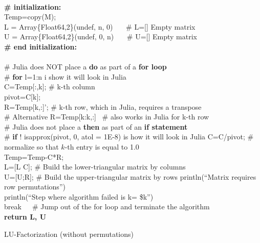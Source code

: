    
\vspace*{.4cm}


\begin{tcolorbox}[sharp corners, colback=green!30, colframe=green!80!blue, title=\textbf{\Large LU Factorization}]
\begin{algorithm}[H]
\SetAlgoLined
{}
\mbox{} \\
 \textbf{\# initialization:}\\
 {\rm Temp}=copy(M); \\
L = Array\{Float64,2\}(undef, n, 0)  ~~~\# L=[] Empty matrix\\
U = Array\{Float64,2\}(undef, 0, n)  ~~~\# U=[] Empty matrix\\
  \textbf{\# end initialization:}\\
  \mbox{} \\
 {
    \# Julia does NOT place a \textbf{do} as part of a \textbf{for loop} \\
    \# \textbf{for} l=1:n i show it will look in Julia\\
    C=Temp[:,k]; \# k-th column \\
        pivot=C[k]; \\
    R={\rm Temp}[k,:]'; \# k-th row, which in Julia, requires a transpose\\
    \# Alternative R={\rm Temp}[k:k,:] ~\# also works in Julia for k-th row\\
  { 
    \# Julia does not place a \textbf{then} as part of an  \textbf{if statement}\\
    \# \textbf{if} ! isapprox(pivot, 0, atol = 1E-8) is how it will look in Julia
    C=C/pivot; \# normalize so that $k$-th entry is equal to 1.0 \\
    {\rm Temp}={\rm Temp}-C*R; \\
     L=[L C];  \# Build the lower-triangular matrix by columns\\
    U=[U;R]; \# Build the upper-triangular matrix by rows\;
   }
   {
   println(``Matrix requires row permutations'') \\
   println(``Step where algorithm failed is k= \$k'')   \\
   break~~~\# Jump out of the for loop and terminate the algorithm 
  }
}
\mbox{ } \\
   \textbf{return L, U}
 \caption{LU-Factorization (without permutations)}
\end{algorithm}
\end{tcolorbox}

